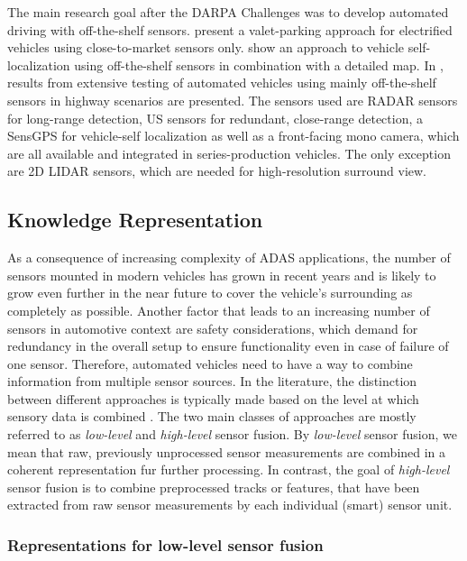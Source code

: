 The main research goal after the \ac{DARPA} Challenges was to develop automated driving with off-the-shelf sensors.
\textcite{Furgale2013} present a valet-parking approach for electrified vehicles using close-to-market sensors only.
\textcite{Lundgren2014} show an approach to vehicle self-localization using off-the-shelf sensors in combination with a detailed map.
In \textcite{Aeberhard2015}, results from extensive testing of automated vehicles using mainly off-the-shelf sensors in highway scenarios are presented.
The sensors used are \ac{RADAR} sensors for long-range detection, \acf{US} sensors for redundant, close-range detection, a \ac{SensGPS} for vehicle-self localization as well as a front-facing mono camera, which are all available and integrated in series-production vehicles.
The only exception are 2D \ac{LIDAR} sensors, which are needed for high-resolution surround view.

\subsection{Knowledge Representation}
\label{subsec:knowledge_representation}

As a consequence of increasing complexity of \ac{ADAS} applications, the number of sensors mounted in modern vehicles has grown in recent years and is likely to grow even further in the near future to cover the vehicle's surrounding as completely as possible.
Another factor that leads to an increasing number of sensors in automotive context are safety considerations, which demand for redundancy in the overall setup to ensure functionality even in case of failure of one sensor.
Therefore, automated vehicles need to have a way to combine information from multiple sensor sources.
In the literature, the distinction between different approaches is typically made based on the level at which sensory data is combined \parencite{Elfring2016}.
The two main classes of approaches are mostly referred to as \emph{low-level} and \emph{high-level} sensor fusion.
By \emph{low-level} sensor fusion, we mean that raw, previously unprocessed sensor measurements are combined in a coherent representation fur further processing.
In contrast, the goal of \emph{high-level} sensor fusion is to combine preprocessed tracks or features, that have been extracted from raw sensor measurements by each individual (smart) sensor unit.

\subsubsection{Representations for low-level sensor fusion}

